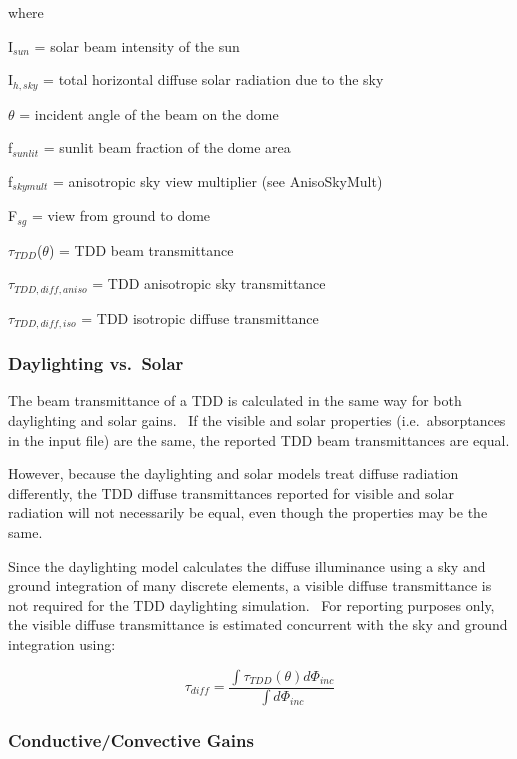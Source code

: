 where

I\(_{sun}\) = solar beam intensity of the sun

I\(_{h,sky}\) = total horizontal diffuse solar radiation due to the sky

\(\theta\) = incident angle of the beam on the dome

f\(_{sunlit}\) = sunlit beam fraction of the dome area

f\(_{skymult}\) = anisotropic sky view multiplier (see AnisoSkyMult)

F\(_{sg}\) = view from ground to dome

\(\tau_{TDD}\)(\(\theta\)) = TDD beam transmittance

\(\tau_{TDD,diff,aniso}\) = TDD anisotropic sky transmittance

\(\tau_{TDD,diff,iso}\) = TDD isotropic diffuse transmittance

\subsubsection{Daylighting vs.~Solar}\label{daylighting-vs.solar}

The beam transmittance of a TDD is calculated in the same way for both daylighting and solar gains.~ If the visible and solar properties (i.e.~absorptances in the input file) are the same, the reported TDD beam transmittances are equal.

However, because the daylighting and solar models treat diffuse radiation differently, the TDD diffuse transmittances reported for visible and solar radiation will not necessarily be equal, even though the properties may be the same.

Since the daylighting model calculates the diffuse illuminance using a sky and ground integration of many discrete elements, a visible diffuse transmittance is not required for the TDD daylighting simulation.~ For reporting purposes only, the visible diffuse transmittance is estimated concurrent with the sky and ground integration using:

\begin{equation}
{\tau_{diff}} = \frac{{\int {{\tau_{TDD}}(\theta )d{\Phi_{inc}}} }}{{\int {d{\Phi_{inc}}} }}
\end{equation}

\subsubsection{Conductive/Convective Gains}\label{conductiveconvective-gains}

